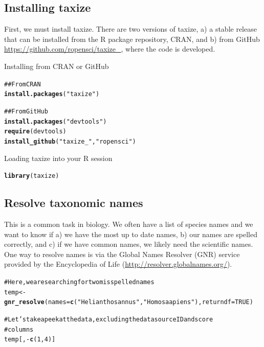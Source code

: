 \documentclass[letterpaper,superscriptaddress,showkeys,longbibliography,10pt]{revtex4-1}\usepackage{graphicx, color}
\makeatletter
\newcommand{\hlfunctioncall}[1]{\textcolor[rgb]{0.501960784313725,0,0.329411764705882}{\textbf{#1}}}%
\newcommand{\hlstring}[1]{\textcolor[rgb]{0.6,0.6,1}{#1}}%
\newcommand{\hlcomment}[1]{\textcolor[rgb]{0.180392156862745,0.6,0.341176470588235}{#1}}%
\newenvironment{kframe}{%
 \def\at@end@of@kframe{}%
 \ifinner\ifhmode%
  \def\at@end@of@kframe{\end{minipage}}%
  \begin{minipage}{\columnwidth}%
 \fi\fi%
 \def\FrameCommand##1{\hskip\@totalleftmargin \hskip-\fboxsep
 \colorbox{shadecolor}{##1}\hskip-\fboxsep
     \hskip-\linewidth \hskip-\@totalleftmargin \hskip\columnwidth}%
 \MakeFramed {\advance\hsize-\width
   \@totalleftmargin\z@ \linewidth\hsize
   \@setminipage}}%
 {\par\unskip\endMakeFramed%
 \at@end@of@kframe}
\newenvironment{knitrout}{}{} %
\makeatother
\begin{document}
\subsection{Installing taxize}

First, we must install taxize. There are two versions of taxize, a) a stable release that can be installed from the R package repository, CRAN, and b) from GitHub \url{https://github.com/ropensci/taxize_}, where the code is developed.

Installing from CRAN or GitHub

\begin{knitrout}
\color{fgcolor}\begin{kframe}
\begin{alltt}
\hlcomment{## From CRAN}
\hlfunctioncall{install.packages}(\hlstring{"taxize"})

\hlcomment{## From GitHub}
\hlfunctioncall{install.packages}(\hlstring{"devtools"})
\hlfunctioncall{require}(devtools)
\hlfunctioncall{install_github}(\hlstring{"taxize_"}, \hlstring{"ropensci"})
\end{alltt}
\end{kframe}
\end{knitrout}


Loading taxize into your R session

\begin{knitrout}
\color{fgcolor}\begin{kframe}
\begin{alltt}
\hlfunctioncall{library}(taxize)
\end{alltt}
\end{kframe}
\end{knitrout}


\subsection{Resolve taxonomic names}

This is a common task in biology. We often have a list of species names and we want to know if a) we have the most up to date names, b) our names are spelled correctly, and c) if we have common names, we likely need the scientific names. One way to resolve names is via the Global Names Resolver (GNR) service provided by the Encyclopedia of Life (\url{http://resolver.globalnames.org/}).

\begin{knitrout}
\color{fgcolor}\begin{kframe}
\begin{alltt}
\hlcomment{# Here, we are searching for two misspelled names}
temp <- \hlfunctioncall{gnr_resolve}(names = \hlfunctioncall{c}(\hlstring{"Helianthos annus"}, \hlstring{"Homo saapiens"}), returndf = TRUE)

\hlcomment{# Let's take a peek at the data, excluding the data source ID and score}
\hlcomment{# columns}
temp[, -\hlfunctioncall{c}(1, 4)]
\end{alltt}
\end{kframe}
\end{knitrout}
\end{document}
